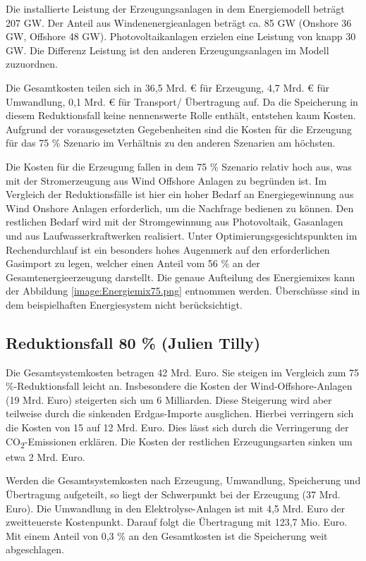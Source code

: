 Die installierte Leistung der Erzeugungsanlagen in dem Energiemodell beträgt 207 GW. Der Anteil aus Windenenergieanlagen beträgt ca. 85 GW (Onshore 36 GW, Offshore 48 GW). Photovoltaikanlagen erzielen eine Leistung von knapp 30 GW. Die Differenz Leistung ist den anderen Erzeugungsanlagen im Modell zuzuordnen. 

Die Gesamtkosten teilen sich in 36,5 Mrd. € für Erzeugung, 4,7 Mrd. € für Umwandlung, 0,1 Mrd. € für Transport/ Übertragung auf. Da die Speicherung in diesem Reduktionsfall keine nennenswerte Rolle enthält, entstehen kaum Kosten. Aufgrund der vorausgesetzten Gegebenheiten sind die Kosten für die Erzeugung für das 75 \% Szenario im Verhältnis zu den anderen Szenarien am höchsten. 

Die Kosten für die Erzeugung fallen in dem 75 \% Szenario relativ hoch aus, was mit der Stromerzeugung aus Wind Offshore Anlagen zu begründen ist. Im Vergleich der Reduktionsfälle ist hier ein hoher Bedarf an Energiegewinnung aus Wind Onshore Anlagen erforderlich, um die Nachfrage bedienen zu können. Den restlichen Bedarf wird mit der Stromgewinnung aus Photovoltaik, Gasanlagen und aus Laufwasserkraftwerken realisiert. Unter Optimierungsgesichtspunkten im Rechendurchlauf ist ein besonders hohes Augenmerk auf den erforderlichen Gasimport zu legen, welcher einen Anteil vom 56 \% an der Gesamtenergieerzeugung darstellt. Die genaue Aufteilung des Energiemixes kann der Abbildung \ref{image:Energiemix75.png} entnommen werden. Überschüsse sind in dem beispielhaften Energiesystem nicht berücksichtigt.
 


\newpage
\subsection{Reduktionsfall 80 \% (Julien Tilly)}
Die Gesamtsystemkosten betragen 42 Mrd. Euro. Sie steigen im Vergleich zum 75 \%-Reduktionsfall leicht an. Insbesondere die Kosten der Wind-Offshore-Anlagen (19 Mrd. Euro) steigerten sich um 6 Milliarden. Diese Steigerung wird aber teilweise durch die sinkenden Erdgas-Importe ausglichen. Hierbei verringern sich die Kosten von 15 auf 12 Mrd. Euro. Dies lässt sich durch die Verringerung der CO\textsubscript{2}-Emissionen erklären. Die Kosten der restlichen Erzeugungsarten sinken um etwa 2 Mrd. Euro.

Werden die Gesamtsystemkosten nach Erzeugung, Umwandlung, Speicherung und Über\-tragung aufgeteilt, so liegt der Schwerpunkt bei der Erzeugung (37 Mrd. Euro). Die Umwandlung in den Elektrolyse-Anlagen ist mit 4,5 Mrd. Euro der zweitteuerste Kostenpunkt. Darauf folgt die Übertragung mit 123,7 Mio. Euro. Mit einem Anteil von 0,3 \% an den Gesamtkosten ist die Speicherung weit abgeschlagen.

